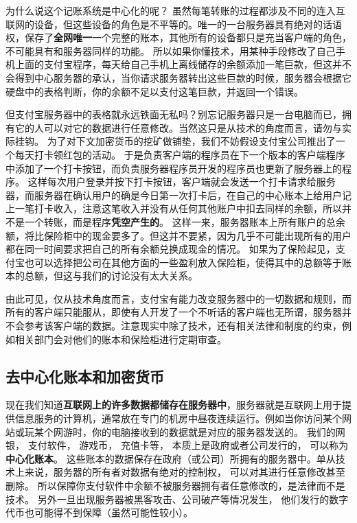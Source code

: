 为什么说这个记账系统是中心化的呢？ 虽然每笔转账的过程都涉及不同的连入互联网的设备，但这些设备的角色是不平等的。唯一的一台服务器具有绝对的话语权，保存了\textbf{全网唯一}一个完整的账本，其他所有的设备都只是充当客户端的角色，不可能具有和服务器同样的功能。 所以如果你懂技术，用某种手段修改了自己手机上面的支付宝程序，每天给自己手机上离线储存的余额添加一笔巨款，但这并不会得到中心服务器的承认，当你请求服务器转出这些巨款的时候，服务器会根据它硬盘中的表格判断，你的余额不足以支付这笔巨款，并返回一个错误。

但支付宝服务器中的表格就永远铁面无私吗？别忘记服务器只是一台电脑而已，拥有它的人可以对它的数据进行任意修改。当然这只是从技术的角度而言，请勿与实际挂钩。 为了对下文加密货币的挖矿做铺垫，我们不妨假设支付宝公司推出了一个每天打卡领红包的活动。 于是负责客户端的程序员在下一个版本的客户端程序中添加了一个打卡按钮，而负责服务器程序员开发的程序员也更新了服务器上的程序。 这样每次用户登录并按下打卡按钮，客户端就会发送一个打卡请求给服务器，而服务器在确认用户的确是今日第一次打卡后，在自己的中心账本上给用户记上一笔打卡收入，注意这笔收入并没有从任何其他账户中扣去同样的余额，所以并不是一个转账，而是程序\textbf{凭空产生的}。 这样一来，服务器账本上所有账户的总余额，将比保险柜中的现金要多了。但这并不要紧，因为几乎不可能出现所有的用户都在同一时间要求把自己的所有余额兑换成现金的情况。 如果为了保险起见，支付宝也可以选择把公司在其他方面的一些盈利放入保险柜，使得其中的总额等于账本的总额，但这与我们的讨论没有太大关系。

由此可见，仅从技术角度而言，支付宝有能力改变服务器中的一切数据和规则，而所有的客户端只能服从，即使有人开发了一个不听话的客户端也无所谓，服务器并不会参考该客户端的数据。注意现实中除了技术，还有相关法律和制度的约束，例如相关部门会对他们的账本和保险柜进行定期审查。

\subsection{去中心化账本和加密货币}
现在我们知道\textbf{互联网上的许多数据都储存在服务器中}，服务器就是互联网上用于提供信息服务的计算机，通常放在专门的机房中昼夜连续运行。例如当你访问某个网站或玩某个网游时，你的电脑接收到的数据就是对应的服务器发送的。 我们的网银， 支付软件， 游戏币， 充值卡等， 本质上是政府或者公司发行的， 可以称为\textbf{中心化账本}。 这些账本的数据保存在政府（或公司）所拥有的服务器中。单从技术上来说，服务器的所有者对数据有绝对的控制权， 可以对其进行任意修改甚至删除。 所以保障你支付软件中余额不被服务器拥有者任意修改的，是法律而不是技术。 另外一旦出现服务器被黑客攻击、公司破产等情况发生， 他们发行的数字代币也可能得不到保障（虽然可能性较小）。


